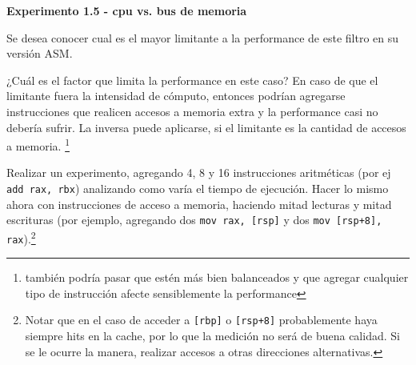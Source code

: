 \newpage

\vspace*{0.3cm} \noindent
\textbf{Experimento 1.5 - cpu vs. bus de memoria}

Se desea conocer cual es el mayor limitante a la
performance de este filtro en su versión ASM.

¿Cuál es el factor que limita la performance en este caso?
En caso de que el limitante fuera la intensidad de cómputo, entonces 
podrían agregarse instrucciones que realicen accesos a memoria extra y la
performance casi no debería sufrir. 
La inversa puede aplicarse, si el limitante es la cantidad de accesos a memoria.
\footnote{también podría pasar que estén más bien balanceados y que agregar
cualquier tipo de instrucción afecte sensiblemente la performance}
	
Realizar un experimento, agregando 4, 8 y 16 instrucciones aritméticas 
(por ej \verb|add rax, rbx|) analizando como varía el tiempo de ejecución.
Hacer lo mismo ahora con instrucciones de acceso a memoria, haciendo 
mitad lecturas y mitad escrituras (por ejemplo, agregando dos 
\verb|mov rax, [rsp]| y dos \verb|mov [rsp+8], rax|).\footnote{Notar que en el caso de acceder a \texttt{[rbp]} o \texttt{[rsp+8]} probablemente haya siempre hits en la cache, por lo que la medición no será de buena calidad. Si se le ocurre la manera, realizar accesos a otras direcciones alternativas.}
	
